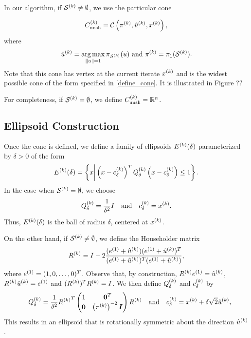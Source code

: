 \documentclass{article}
\begin{document}
In our algorithm, if $\mathcal{S}^{(k)} \ne \emptyset$, we use the particular cone

\[ {C^{(k)}_{\textrm{unsh}}} = \mathcal C\left(\pi^{(k)},  \hat{u}^{(k)},  x^{(k)} \right), \]
where 
\[ \hat{u}^{(k)} =  \operatorname*{arg\,max}_{\|u\|=1} \pi_{\mathcal{S}^{(k)}}(u) \ \mbox{and} \ \pi^{(k)} = {\pi_1}(\mathcal{S}^{(k)}).\]
%
Note that this cone has vertex at the current iterate $x^{(k)}$ and is the widest possible cone of the form specified in \cref{define_cone}.    It is illustrated in Figure ??  %

For completeness, if $\mathcal{S}^{(k)} = \emptyset$, we define ${C^{(k)}_{\textrm{unsh}}} = \mathbb R^n$.
\subsection{Ellipsoid Construction}
\label{ellipsoid_construction}
Once the cone is defined,  we define a family of ellipsoids ${E^{(k)}}(\delta)$ parameterized by $\delta>0$ 
of the form
\begin{equation}
\label{define_linear_nontrival_ellipsoid_delta}
{E^{(k)}}(\delta) = \left\{x \bigg| \left(x-c^{(k)}_{\delta}\right)^T{Q^{(k)}_{\delta}}\left(x-c^{(k)}_{\delta}\right) \le 1\right\}.
\end{equation}
In the case when $\mathcal{S}^{(k)} = \emptyset$,  we choose
\begin{equation}\label{define_Qc_delta_empty}
{Q^{(k)}_{\delta}} = \frac{1}{\delta^2} I \quad \mbox{and}\quad c^{(k)}_{\delta} = x^{(k)}.
\end{equation}
Thus, ${E^{(k)}}(\delta)$ is the ball of radius $\delta$, centered at $x^{(k)}$.

On the other hand, if $\mathcal{S}^{(k)} \ne \emptyset$, we
define the 
Householder matrix 
\begin{align}
{R^{(k)}} = I - 2\frac{({e^{(1)}} + {{{\hat u}^{(k)}}})({e^{(1)}} +{{{\hat u}^{(k)}}})^T}{({e^{(1)}} +{{{\hat u}^{(k)}}})^T({e^{(1)}} +{{{\hat u}^{(k)}}})}, \label{define_r} 
\end{align}
where ${e^{(1)}}=(1,0,\ldots,0)^T$.  Observe that, by construction, ${R^{(k)}} {e^{(1)}}={{{\hat u}^{(k)}}}$, ${R^{(k)}} {{{\hat u}^{(k)}}} = {e^{(1)}}$ and $({R^{(k)}})^T{R^{(k)}}=I$.
We then define ${Q^{(k)}_{\delta}}$ and $c^{(k)}_{\delta}$ by
\begin{align*}
\quad {Q^{(k)}_{\delta}} = \frac {1} {\delta^2} {R^{(k)}}^T \begin{pmatrix}
1 & \boldsymbol0^T \\
\boldsymbol 0 & \left({\pi^{(k)}}\right)^{-2} \boldsymbol I \\
\end{pmatrix} {R^{(k)}}
\quad
\textrm{and}
\quad
c^{(k)}_{\delta} = x^{(k)}+\delta \sqrt{2} {{{\hat u}^{(k)}}},
\end{align*}
This results in an ellipsoid that is rotationally symmetric about the direction ${{{\hat u}^{(k)}}}$.
\end{document}
